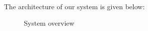 The architecture of our system is given below:
\begin{figure}[!htb]
	\centering
	\vspace{-1em}
	\vspace{-5em}
	\caption{System overview}
	\vspace{-1em}
	\label{system_architecture}
\end{figure}

